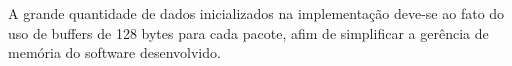 A grande quantidade de dados inicializados na implementa\c{c}\~ao deve-se ao fato do uso de buffers de 128 bytes para cada pacote, afim de simplificar a ger\^encia de mem\'oria do software desenvolvido. %

%

%
